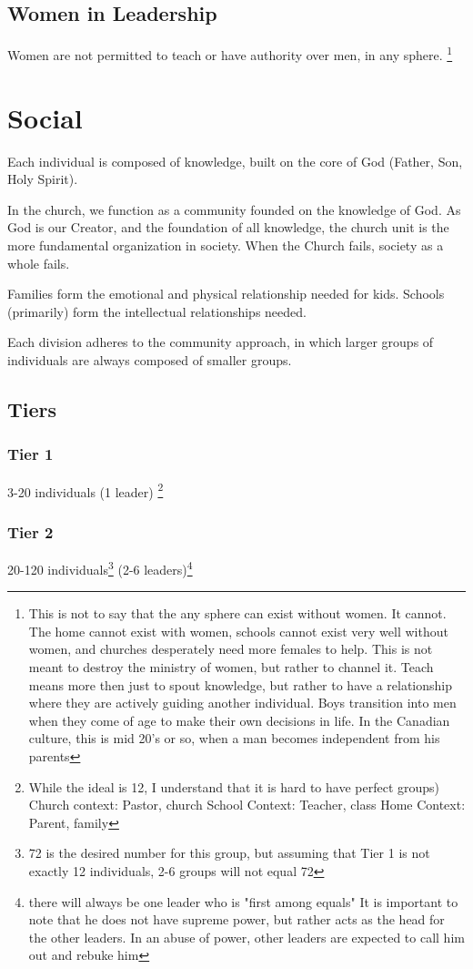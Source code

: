 \documentclass[CSHFoundation.tex]{subfiles}
\begin{document}
\subsection{Women in Leadership}

Women are not permitted to teach or have authority over men, in any sphere. \footnote{This is not to say that the any sphere can exist without women. It cannot. The home cannot exist with women, schools cannot exist very well without women, and churches desperately need more females to help. This is not meant to destroy the ministry of women, but rather to channel it. Teach means more then just to spout knowledge, but rather to have a relationship where they are actively guiding another individual. Boys transition into men when they come of age to make their own decisions in life. In the Canadian culture, this is mid 20's or so, when a man becomes independent from his parents}

\section{Social}

Each individual is composed of knowledge, built on the core of God (Father, Son, Holy Spirit).

	In the church, we function as a community founded on the knowledge of God. As God is our Creator, and the foundation of all knowledge, the church unit is the more fundamental organization in society. When the Church fails, society as a whole fails.
	
	Families form the emotional and physical relationship needed for kids. Schools (primarily) form the intellectual relationships needed.
	
Each division adheres to the community approach, in which larger groups of individuals are always composed of smaller groups.


\subsection{Tiers}
\subsubsection{Tier 1}

3-20 individuals (1 leader) \footnote{While the ideal is 12, I understand that it is hard to have perfect groups)
	Church context: Pastor, church
	School Context: Teacher, class
	Home Context: Parent, family}
\subsubsection{Tier 2}
20-120 individuals\footnote{72 is the desired number for this group, but assuming that Tier 1 is not exactly 12 individuals, 2-6 groups will not equal 72} (2-6 leaders)\footnote{there will always be one leader who is "first among equals" It is important to note that he does not have supreme power, but rather acts as the head for the other leaders. In an abuse of power, other leaders are expected to call him out and rebuke him}
\end{document}
